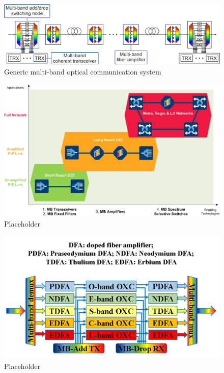 \documentclass[journal]{IEEEtran}
\begin{document}
%
%
%
\begin{figure}[!htb]
\center
\includegraphics[width=1\linewidth]{Figures/Sec_II/EMBRACE_System.png}
\caption{Generic multi-band optical communication system}
\label{fig:system}
\end{figure}
%
\begin{figure}[!htb]
\center
\includegraphics[width=1\linewidth]{Figures/Sec_II/MB_Tech_Evolution.jpg}
\caption{Placeholder}
\label{fig:system}
\end{figure}
%
\begin{figure}[!htb]
\center
\includegraphics[width=1\linewidth]{Figures/Sec_II/ROADM_node.png}
\caption{Placeholder}
\label{fig:system}
\end{figure}
%
\end{document}
